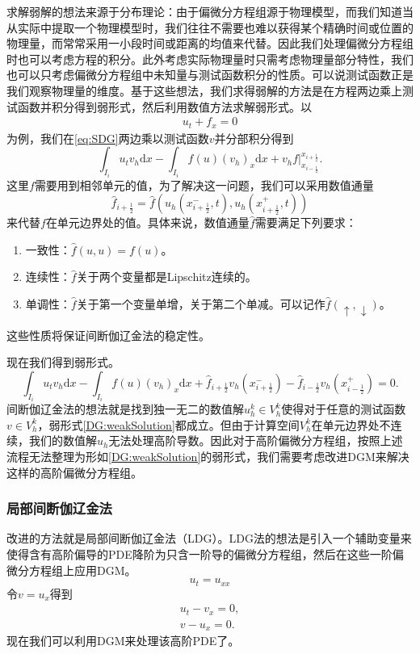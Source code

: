 求解弱解的想法来源于分布理论：由于偏微分方程组源于物理模型，而我们知道当从实际中提取一个物理模型时，我们往往不需要也难以获得某个精确时间或位置的物理量，而常常采用一小段时间或距离的均值来代替。因此我们处理偏微分方程组时也可以考虑方程的积分。此外考虑实际物理量时只需考虑物理量部分特性，我们也可以只考虑偏微分方程组中未知量与测试函数积分的性质。可以说测试函数正是我们观察物理量的维度。基于这些想法，我们求得弱解的方法是在方程两边乘上测试函数并积分得到弱形式，然后利用数值方法求解弱形式。以
\begin{align}
    u_t + f_x = 0\label{eq:SDG}
\end{align}
为例，我们在\eqref{eq:SDG}两边乘以测试函数$v$并分部积分得到
\begin{equation}
    \int_{I_i}u_t v_h\mathrm{d}x - \int_{I_i}f(u)(v_h)_x\mathrm{d}x+v_hf\bigg|^{x_{i+\frac{1}{2}}}_{x_{i-\frac{1}{2}}}.
\end{equation}
这里$f$需要用到相邻单元的值，为了解决这一问题，我们可以采用数值通量
\begin{equation*}
    \hat{f}_{i+\frac{1}{2}}=\hat{f}(u_h(x^-_{i+\frac{1}{2}},t),u_h(x^+_{i+\frac{1}{2}},t))
\end{equation*}
来代替$f$在单元边界处的值。具体来说，数值通量$\hat{f}$需要满足下列要求：
\begin{enumerate}
    \item 一致性：$\hat{f}(u,u)=f(u)$。
    \item 连续性：$\hat{f}$关于两个变量都是Lipschitz连续的。
    \item 单调性：$\hat{f}$关于第一个变量单增，关于第二个单减。可以记作$\hat{f}(\uparrow,\downarrow)$。
\end{enumerate}
这些性质将保证间断伽辽金法的稳定性。

现在我们得到弱形式。
\begin{equation}
    \int_{I_i}u_t v_h\mathrm{d}x - \int_{I_i}f(u)(v_h)_x\mathrm{d}x+\hat{f}_{i+\frac{1}{2}}v_h(x^-_{i+\frac{1}{2}})-\hat{f}_{i-\frac{1}{2}}v_h(x^+_{i-\frac{1}{2}}) = 0. \label{DG:weakSolution}
\end{equation}
间断伽辽金法的想法就是找到独一无二的数值解$u_h^k\in V_h^k$使得对于任意的测试函数$v \in V_h^k$，弱形式\eqref{DG:weakSolution}都成立。但由于计算空间$V_h^k$在单元边界处不连续，我们的数值解$u_h$无法处理高阶导数。因此对于高阶偏微分方程组，按照上述流程无法整理为形如\eqref{DG:weakSolution}的弱形式，我们需要考虑改进DGM来解决这样的高阶偏微分方程组。
\subsubsection{局部间断伽辽金法}
改进的方法就是局部间断伽辽金法（LDG）。LDG法的想法是引入一个辅助变量来使得含有高阶偏导的PDE降阶为只含一阶导的偏微分方程组，然后在这些一阶偏微分方程组上应用DGM。
\begin{equation}
    u_t = u_{xx}
\end{equation}
令$v = u_x$得到
\begin{align}
    u_t - v_x = 0, \\
    v - u_x = 0.
\end{align}
现在我们可以利用DGM来处理该高阶PDE了。
